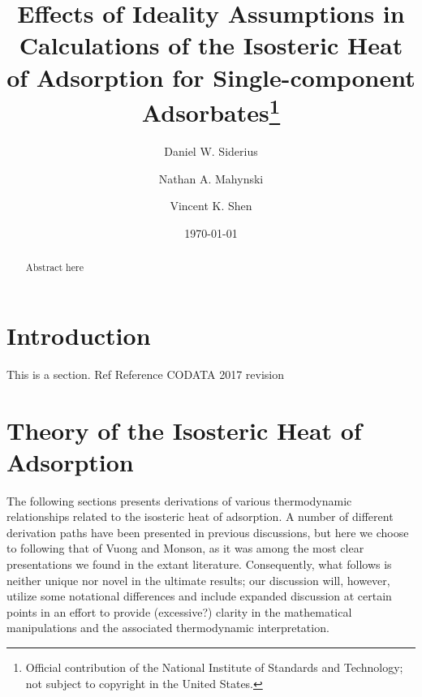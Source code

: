 \documentclass[preprint,pre,showkeys,12pt,superscriptaddress,nofootinbib]{revtex4-1}
\begin{document}
\title{Effects of Ideality Assumptions in Calculations of the Isosteric Heat of Adsorption for Single-component Adsorbates\footnote{Official contribution of the National Institute of Standards and Technology; not subject to copyright in the United States.}} 


\author{Daniel W. Siderius}
\author{Nathan A. Mahynski}
\author{Vincent K. Shen}


\date{\today}

\begin{abstract}
Abstract here
\end{abstract}

\maketitle

\newpage
\section{Introduction}\label{sec:intro}
This is a section. Ref\cite{Botan_Hard-sphere_2009}
Reference CODATA 2017 revision\cite{Newell_CODATA_2017}

\section{Theory of the Isosteric Heat of Adsorption}\label{sec:theory}

The following sections presents derivations of various thermodynamic relationships related to the isosteric heat of adsorption. A number of different derivation paths have been presented in previous discussions\cite{}, but here we choose to following that of  Vuong and Monson\cite{Vuong_Monte_1996}, as it was among the most clear presentations we found in the extant literature. Consequently, what follows is neither unique nor novel in the ultimate results; our discussion will, however, utilize some notational differences and include expanded discussion at certain points in an effort to provide (excessive?) clarity in the mathematical manipulations and the associated thermodynamic interpretation.
\end{document}
